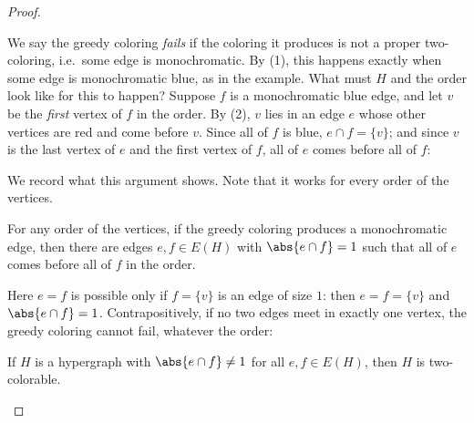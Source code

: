 \begin{proof}
\begin{center}
    \end{center}
    We say the greedy coloring \emph{fails} if the coloring it produces is not a proper two-coloring, i.e.\ some edge is monochromatic. By (1), this happens exactly when some edge is monochromatic blue, as in the example. What must \(H\) and the order look like for this to happen? Suppose \(f\) is a monochromatic blue edge, and let \(v\) be the \emph{first} vertex of \(f\) in the order. By (2), \(v\) lies in an edge \(e\) whose other vertices are red and come before \(v\). Since all of \(f\) is blue, \(e \cap f = \{v\}\); and since \(v\) is the last vertex of \(e\) and the first vertex of \(f\), all of \(e\) comes before all of \(f\):
    \begin{center}
    \end{center}
    We record what this argument shows. Note that it works for every order of the vertices.

    \begin{claim}\label{claim:greedy-fail}
        For any order of the vertices, if the greedy coloring produces a monochromatic edge, then there are edges \(e, f \in E(H)\) with \(\abs{e \cap f} = 1\) such that all of \(e\) comes before all of \(f\) in the order.
    \end{claim}

    Here \(e = f\) is possible only if \(f = \{v\}\) is an edge of size \(1\): then \(e = f = \{v\}\) and \(\abs{e \cap f} = 1\). Contrapositively, if no two edges meet in exactly one vertex, the greedy coloring cannot fail, whatever the order:

    \begin{corollary}
        If \(H\) is a hypergraph with \(\abs{e \cap f} \ne 1\) for all \(e, f \in E(H)\), then \(H\) is two-colorable.
    \end{corollary}


\end{proof}

